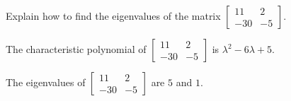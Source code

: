 
\begin{exerciseStatement}


Explain how to find the eigenvalues of the matrix \( \left[\begin{array}{cc}
11 & 2 \\
-30 & -5
\end{array}\right] \).


\end{exerciseStatement}
    
\begin{exerciseAnswer} 


The characteristic polynomial of \( \left[\begin{array}{cc}
11 & 2 \\
-30 & -5
\end{array}\right] \) is \( \lambda^{2} - 6 \lambda + 5 \).



The eigenvalues of \( \left[\begin{array}{cc}
11 & 2 \\
-30 & -5
\end{array}\right] \) are \( 5 \) and \( 1 \).


\end{exerciseAnswer}
    
